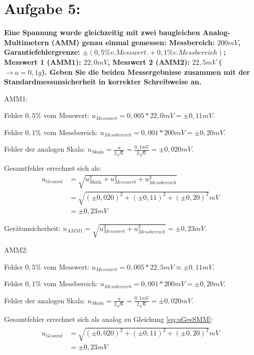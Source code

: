 \documentclass[
]{article}
\begin{document}
\hypertarget{aufgabe-5}{%
\section{Aufgabe 5:}\label{aufgabe-5}}

\textbf{Eine Spannung wurde gleichzeitig mit zwei baugleichen Analog-Multimetern (AMM) genau einmal gemessen: Messbereich: \(200 mV\), Garantiefehlergrenze: \(\pm (0,5\% v. Messwert. + 0,1\% v. Messbereich)\); Messwert 1 (AMM1): \(22,0 mV\), Messwert 2 (AMM2): \(22,5 mV\) (\(\rightarrow a=0,1g\)). 
Geben Sie die beiden Messergebnisse zusammen mit der Standardmessunsicherheit in korrekter Schreibweise an.}

AMM1:

Fehler \(0,5\%\) vom Messwert:
\(u_{Messwert} = 0,005 * 22,0mV = \pm0,11mV\).

Fehler \(0,1\%\) vom Messbereich:
\(u_{Messbereich} = 0,001 * 200mV = \pm0,20mV\).

Fehler der analogen Skala:
\(u_{Skala} = \frac{a}{2\sqrt{6}} = \frac{0,1mV}{2\sqrt{6}}=\pm0,020mV\).

Gesamtfehler errechnet sich als: 
\begin{equation}\label{eq:uGesSMM}
  	\begin{split}
		u_{Gesamt} &= \sqrt{u_{Skala}^2+u_{Messwert}^2+u_{Messbereich}^2}\\
        &= \sqrt{(\pm 0,020)^2+(\pm 0,11)^2+(\pm0,20)^2}mV\\
        &= \pm 0,23mV
	\end{split}
\end{equation}

Gerätunsicherheit:
\(u_{AMM1} = \sqrt{u_{Messwert}^2+u_{Messbereich}^2} = \pm0,23 mV\).

AMM2:

Fehler \(0,5\%\) vom Messwert:
\(u_{Messwert} = 0,005 * 22,5mV \approx \pm 0,11mV\).

Fehler \(0,1\%\) vom Messbereich:
\(u_{Messbereich} = 0,001 * 200mV = \pm0,20mV\).

Fehler der analogen Skala:
\(u_{Skala} = \frac{a}{2\sqrt{6}} = \frac{0,1mV}{2\sqrt{6}}=\pm0,020mV\).

Gesamtfehler errechnet sich als analog zu Gleichung \ref{eq:uGesSMM}:
\begin{align*}
	\begin{split}
		u_{Gesamt}&= \sqrt{(\pm 0,020)^2+(\pm 0,11)^2+(\pm0,20)^2}mV\\
        &= \pm 0,23mV
	\end{split}
\end{align*}
\end{document}
